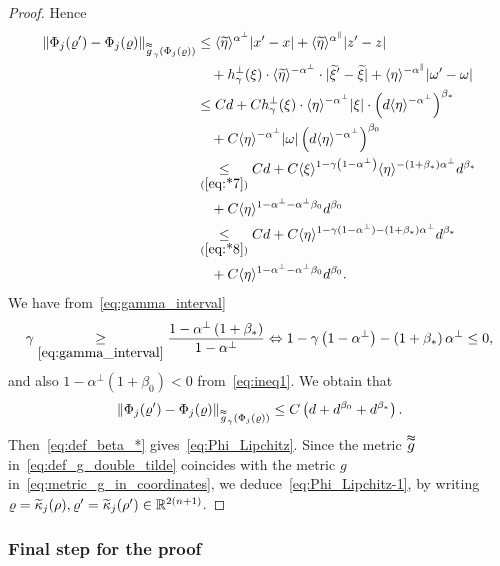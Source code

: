 \documentclass[10pt]{amsart}
\theoremstyle{definition}\newtheorem{defi}[theo]{Definition}\newtheorem{rema}[theo]{Remark}\newtheorem{exam}[theo]{Example}\newtheorem{exem}[theo]{Example}\newtheorem{nota}[theo]{Notation}
\newcommand*\ineq[1]{\underset{(#1)}{\leq}}
\newcommand{\bbR}{\mathbb{R}}
\let\oldtilde\tilde
\renewcommand*{\tilde}[1]{\mathchoice{\widetilde{#1}}{\widetilde{#1}}{\oldtilde{#1}}{\oldtilde{#1}}}
\begin{document}
\begin{proof}
Hence
\begin{align*}
\left\|\Phi_{j}(\varrho')-\Phi_{j}(\varrho)\right\|_{\overset{\thickapprox}{g}_{\gamma}\left(\Phi_{j}\left(\varrho\right)\right)} & \le\langle\tilde{\eta}\rangle^{\alpha^{\perp}}|x'-x|+\langle\tilde{\eta}\rangle^{\alpha^{\parallel}}|z'-z|\\
& \quad+h_{\gamma}^{\perp}(\xi)\cdot\langle\tilde{\eta}\rangle^{-\alpha^{\perp}}\cdot|\tilde{\xi}'-\tilde{\xi}|+\langle\eta\rangle^{-\alpha^{\parallel}}|\omega'-\omega|\\
& \le Cd+Ch_{\gamma}^{\perp}(\xi)\cdot\langle\eta\rangle^{-\alpha^{\perp}}|\xi|\cdot\left(d\langle\eta\rangle^{-\alpha^{\perp}}\right)^{\beta_{*}}\\
& \quad+C\langle\eta\rangle^{-\alpha^{\perp}}|\omega|\left(d\langle\eta\rangle^{-\alpha^{\perp}}\right)^{\beta_{0}}\\
& \ineq{\ref{eq:*7}}Cd+C\langle\xi\rangle^{1-\gamma\left(1-\alpha^{\perp}\right)}\langle\eta\rangle^{-\left(1+\beta_{*}\right)\alpha^{\perp}}d^{\beta_{*}}\\
& \quad+C\langle\eta\rangle^{1-\alpha^{\perp}-\alpha^{\perp}\beta_{0}}d^{\beta_{0}}\\
& \ineq{\ref{eq:*8}}Cd+C\langle\eta\rangle^{1-\gamma(1-\alpha^{\perp})-(1+\beta_{*})\alpha^{\perp}}d^{\beta_{*}}\\
& \quad+C\langle\eta\rangle^{1-\alpha^{\perp}-\alpha^{\perp}\beta_{0}}d^{\beta_{0}}.
\end{align*}
We have from~\eqref{eq:gamma_interval}
\begin{align*}
\gamma\underset{\eqref{eq:gamma_interval}}{\geq}\frac{1-\alpha^{\perp}\left(1+\beta_{*}\right)}{1-\alpha^{\perp}}
\Leftrightarrow  1-\gamma\left(1-\alpha^{\perp}\right)-\left(1+\beta_{*}\right)\alpha^{\perp}\leq0,
\end{align*}
and also $1-\alpha^{\perp}(1+\beta_{0})<0$ from~\eqref{eq:ineq1}. We obtain that
\[
\left\|\Phi_{j}(\varrho')-\Phi_{j}(\varrho)\right\|_{\overset{\thickapprox}{g}_{\gamma}\left(\Phi_{j}\left(\varrho\right)\right)}\le C\left(d+d^{\beta_{0}}+d^{\beta_{*}}\right).
\]
Then~\eqref{eq:def_beta_*} gives~\eqref{eq:Phi_Lipchitz}. Since the metric $\overset{\thickapprox}{g}$ in~\eqref{eq:def_g_double_tilde} coincides with the metric $g$ in~\eqref{eq:metric_g_in_coordinates}, we deduce~\eqref{eq:Phi_Lipchitz-1}, by writing $\varrho=\tilde{\kappa}_{j}(\rho),\varrho'=\tilde{\kappa}_{j}(\rho')\in\bbR^{2(n+1)}$.
\end{proof}

\subsubsection{Final step for the proof}
\end{document}
